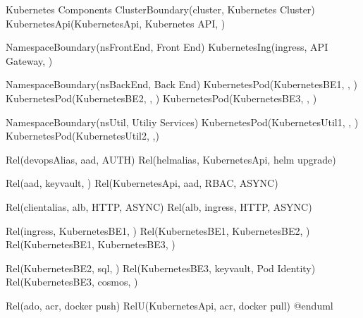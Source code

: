 \documentclass[letterpaper,10pt,english]{sphinxmanual}
\begin{document}
\begin{sphinxVerbatim}[commandchars=\\\{\},numbers=left,firstnumber=1,stepnumber=1]
\PYGZsq{} Kubernetes Components
Cluster\PYGZus{}Boundary(cluster, \PYGZdq{}Kubernetes Cluster\PYGZdq{}) \PYGZob{}
    KubernetesApi(KubernetesApi, \PYGZdq{}Kubernetes API\PYGZdq{}, \PYGZdq{}\PYGZdq{})
    
    Namespace\PYGZus{}Boundary(nsFrontEnd, \PYGZdq{}Front End\PYGZdq{}) \PYGZob{}
        KubernetesIng(ingress, \PYGZdq{}API Gateway\PYGZdq{}, \PYGZdq{}\PYGZdq{})
    \PYGZcb{}

    Namespace\PYGZus{}Boundary(nsBackEnd, \PYGZdq{}Back End\PYGZdq{}) \PYGZob{}
        KubernetesPod(KubernetesBE1, \PYGZdq{}\PYGZdq{}, \PYGZdq{}\PYGZdq{})
        KubernetesPod(KubernetesBE2, \PYGZdq{}\PYGZdq{}, \PYGZdq{}\PYGZdq{})
        KubernetesPod(KubernetesBE3, \PYGZdq{}\PYGZdq{}, \PYGZdq{}\PYGZdq{})
    \PYGZcb{}

    Namespace\PYGZus{}Boundary(nsUtil, \PYGZdq{}Utiliy Services\PYGZdq{}) \PYGZob{}
        KubernetesPod(KubernetesUtil1, \PYGZdq{}\PYGZdq{}, \PYGZdq{}\PYGZdq{})
        KubernetesPod(KubernetesUtil2, \PYGZdq{}\PYGZdq{},\PYGZdq{}\PYGZdq{})
    \PYGZcb{}
\PYGZcb{}

Rel(devopsAlias, aad, \PYGZdq{}AUTH\PYGZdq{})
Rel(helmalias, KubernetesApi, \PYGZdq{}helm upgrade\PYGZdq{})

Rel(aad, keyvault, \PYGZdq{} \PYGZdq{})
Rel(KubernetesApi, aad, \PYGZdq{}RBAC\PYGZdq{}, \PYGZdq{}ASYNC\PYGZdq{})

Rel(clientalias, alb, \PYGZdq{}HTTP\PYGZdq{}, \PYGZdq{}ASYNC\PYGZdq{})
Rel(alb, ingress, \PYGZdq{}HTTP\PYGZdq{}, \PYGZdq{}ASYNC\PYGZdq{})

Rel(ingress, KubernetesBE1, \PYGZdq{} \PYGZdq{})
Rel(KubernetesBE1, KubernetesBE2, \PYGZdq{} \PYGZdq{})
Rel(KubernetesBE1, KubernetesBE3, \PYGZdq{} \PYGZdq{})

Rel(KubernetesBE2, sql, \PYGZdq{} \PYGZdq{})
Rel(KubernetesBE3, keyvault, \PYGZdq{}Pod Identity\PYGZdq{})
Rel(KubernetesBE3, cosmos, \PYGZdq{} \PYGZdq{})

Rel(ado, acr, \PYGZdq{}docker push\PYGZdq{})
Rel\PYGZus{}U(KubernetesApi, acr, \PYGZdq{}docker pull\PYGZdq{})
@enduml
\end{sphinxVerbatim}
\sphinxresetverbatimhllines
\end{document}
